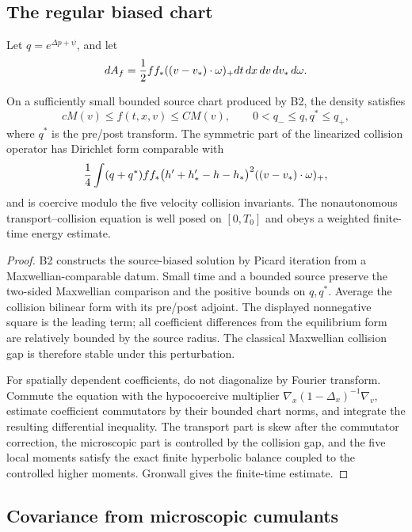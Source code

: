 \subsection{The regular biased chart}

Let \(q=e^{\Delta p+\psi}\), and let
\[
 dA_f={1\over2}ff_*((v-v_*)\cdot\omega)_+
 dt\,dx\,dv\,dv_*\,d\omega .
\]

\begin{lemma}
\label{lem:r14-b3-energy}
On a sufficiently small bounded source chart produced by B2, the density
satisfies
\[
 cM(v)\le f(t,x,v)\le CM(v),\qquad
 0<q_-\le q,q^*\le q_+,
\]
where \(q^*\) is the pre/post transform.  The symmetric part of the
linearized collision operator has Dirichlet form comparable with
\[
 {1\over4}\int
 (q+q^*)ff_*
 \bigl(h'+h_*'-h-h_*\bigr)^2
 ((v-v_*)\cdot\omega)_+ ,
\]
and is coercive modulo the five velocity collision invariants.  The
nonautonomous transport--collision equation is well posed on
\([0,T_0]\) and obeys a weighted finite-time energy estimate.
\end{lemma}

\begin{proof}
B2 constructs the source-biased solution by Picard iteration from a
Maxwellian-comparable datum.  Small time and a bounded source preserve the
two-sided Maxwellian comparison and the positive bounds on \(q,q^*\).
Average the collision bilinear form with its pre/post adjoint.  The displayed
nonnegative square is the leading term; all coefficient differences from the
equilibrium form are relatively bounded by the source radius.  The classical
Maxwellian collision gap is therefore stable under this perturbation.

For spatially dependent coefficients, do not diagonalize by Fourier
transform.  Commute the equation with the hypocoercive multiplier
\(\nabla_x(1-\Delta_x)^{-1}\nabla_v\), estimate coefficient commutators by
their bounded chart norms, and integrate the resulting differential
inequality.  The transport part is skew after the commutator correction, the
microscopic part is controlled by the collision gap, and the five local
moments satisfy the exact finite hyperbolic balance coupled to the controlled
higher moments.  Gronwall gives the finite-time estimate.
\end{proof}

\subsection{Covariance from microscopic cumulants}

